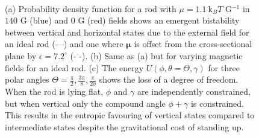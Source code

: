\documentclass[aps,prl,reprint,twocolumn,superscriptaddress,showpacs]{revtex4-1}
\newcommand{\vc}[1]{\boldsymbol{#1}}
\newcommand{\kk}{\mathrm{k}_B}
\begin{document}
\begin{figure}
\centering
{}
 \\
    \caption{\footnotesize (a) Probability density function for a rod with $\mu=1.1\ \kk T$ G$^{-1}$ in $140$ G (blue) and $0$ G (red) fields shows an emergent bistability between vertical and horizontal states due to the external field for an ideal rod (---) and one where $\vc{\mu}$ is offset from the cross-sectional plane by $\epsilon=7.2^\circ$ (- -). (b) Same as (a) but for varying magnetic fields for an ideal rod. (c) The energy $U(\phi,\theta=\Theta,\gamma)$ for three polar angles $\Theta=\frac{\pi}{2},\frac{3\pi}{8},\frac{\pi}{20}$ shows the loss of a degree of freedom. When the rod is lying flat, $\phi$ and $\gamma$ are independently constrained, but when vertical only the compound angle $\phi+\gamma$ is constrained. This results in the entropic favouring of vertical states compared to intermediate states despite the gravitational cost of standing up. \label{theory}}
\end{figure}
\end{document}
